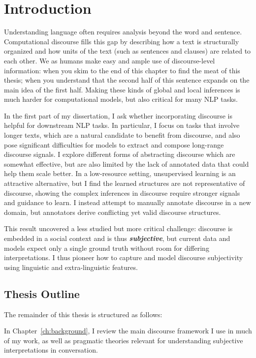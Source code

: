 \chapter{Introduction}
\label{ch:intro}


Understanding language often requires analysis beyond the word and sentence. Computational discourse fills this gap by describing how a text is structurally organized and how units of the text (such as sentences and clauses) are related to each other. We as humans make easy and ample use of discourse-level information: when you skim to the end of this chapter to find the meat of this thesis; when you understand that the second half of this sentence expands on the main idea of the first half. Making these kinds of global and local inferences is much harder for computational models, but also critical for many NLP tasks.

In the first part of my dissertation, I ask whether incorporating discourse is helpful for downstream NLP tasks. In particular, I focus on tasks that involve longer texts, which are a natural candidate to benefit from discourse, and also pose significant difficulties for models to extract and compose long-range discourse signals. I explore different forms of abstracting discourse which are somewhat effective, but are also limited by the lack of annotated data that could help them scale better. In a low-resource setting, unsupervised learning is an attractive alternative, but I find the learned structures are not representative of discourse, showing the complex inferences in discourse require stronger signals and guidance to learn. I instead attempt to manually annotate discourse in a new domain, but annotators derive conflicting yet valid discourse structures. 

This result uncovered a less studied but more critical challenge: discourse is embedded in a social context and is thus \textbf{\emph{subjective}}, but current data and models expect only a single ground truth without room for differing interpretations. I thus pioneer how to capture and model discourse subjectivity using linguistic and extra-linguistic features. 

\section{Thesis Outline}

The remainder of this thesis is structured as follows:

In Chapter~\ref{ch:background}, I review the main discourse framework I use in much of my work, as well as pragmatic theories relevant for understanding subjective interpretations in conversation.


